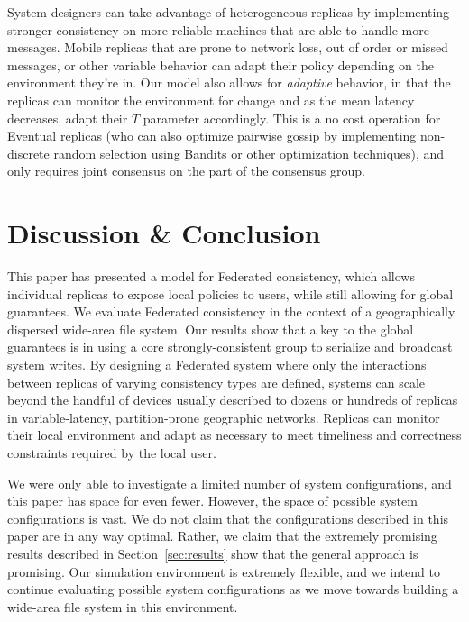 \documentclass[10pt,conference,letterpaper]{IEEEtran}
\begin{document}
System designers can take advantage of heterogeneous replicas by implementing
stronger consistency on more reliable machines that are able to handle more
messages.
Mobile replicas that are prone to network loss, out of order or missed
messages, or other variable behavior can adapt their policy depending on the
environment they're in.
Our model also allows for \textit{adaptive} behavior, in that the replicas can
monitor the environment for change and as the mean latency decreases, adapt
their $T$ parameter accordingly.
This is a no cost operation for Eventual replicas (who can also optimize
pairwise gossip by implementing non-discrete random selection using Bandits or
other optimization techniques), and only requires joint consensus on the part
of the consensus group.

\vspace{.5em}
\section{Discussion \& Conclusion}
\label{sec:conclusion}

This paper has presented a model for Federated consistency, which allows individual
replicas to expose local policies to users, while still allowing for global guarantees.
We evaluate Federated consistency in the context of a geographically dispersed wide-area
file system.
Our results show that a key to the global guarantees is in using a core
strongly-consistent group to serialize and broadcast system writes.
By designing a Federated system where only the interactions between replicas of varying
consistency types are defined, systems can scale beyond the handful of devices usually
described to dozens or hundreds of replicas in variable-latency, partition-prone
geographic networks.
Replicas can monitor their local environment and adapt as necessary to meet timeliness and
correctness constraints required by the local user.

We were only able to investigate a limited number of system configurations,
and this paper has space for even fewer.
However, the space of possible system configurations is vast.
We do not claim that the configurations described in this paper are in any way
optimal. Rather, we claim that the extremely promising results described in
Section~\ref{sec:results} show that the general approach is promising.
Our simulation environment is extremely flexible, and we intend to continue
evaluating possible system configurations as we move towards building a
wide-area file system in this environment.
\end{document}
